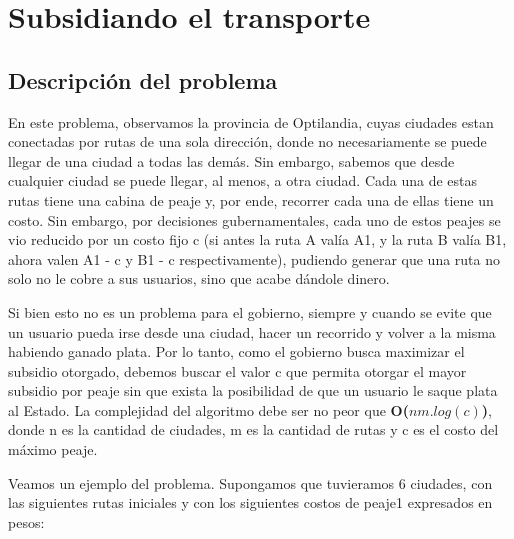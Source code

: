 \section{Subsidiando el transporte}

\newcommand{\tikzcircle}[1][red,fill=red]{\tikz[baseline=-0.5ex]\draw[#1,radius=2pt] (0,0) circle ;}

\subsection{Descripción del problema}
En este problema, observamos la provincia de Optilandia, cuyas ciudades estan conectadas por rutas de una sola dirección, donde no necesariamente se puede llegar de una ciudad a todas las demás. Sin embargo, sabemos que desde cualquier ciudad se puede llegar, al menos, a otra ciudad. Cada una de estas rutas tiene una cabina de peaje y, por ende, recorrer cada una de ellas tiene un costo. Sin embargo, por decisiones gubernamentales, cada uno de estos peajes se vio reducido por un costo fijo c (si antes la ruta A valía A1, y la ruta B valía B1, ahora valen A1 - c y B1 - c respectivamente), pudiendo generar que una ruta no solo no le cobre a sus usuarios, sino que acabe dándole dinero.

Si bien esto no es un problema para el gobierno, siempre y cuando se evite que un usuario pueda irse desde una ciudad, hacer un recorrido y volver a la misma habiendo ganado plata. Por lo tanto, como el gobierno busca maximizar el subsidio otorgado, debemos buscar el valor c que permita otorgar el mayor subsidio por peaje sin que exista la posibilidad de que un usuario le saque plata al Estado. La complejidad del algoritmo debe ser no peor que \textbf{O($nm.log(c)$)}, donde n es la cantidad de ciudades, m es la cantidad de rutas y c es el costo del máximo peaje.

Veamos un ejemplo del problema. Supongamos que tuvieramos 6 ciudades, con las siguientes rutas iniciales y con los siguientes costos de peaje1 expresados en pesos:

\bigskip

